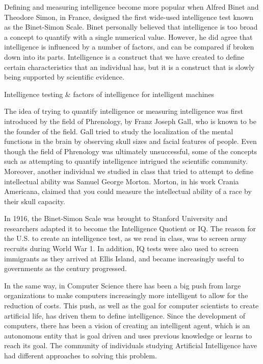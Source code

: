 \documentclass[11pt]{article}
\begin{document}
\par Defining and measuring intelligence become more popular when Alfred Binet and Theodore Simon, in France, designed the first wide-used intelligence test known as the Binet-Simon Scale. Binet personally believed that intelligence is too broad a concept to quantify with a single numerical value. However, he did agree that intelligence is influenced by a number of factors, and can be compared if broken down into its parts. Intelligence is a construct that we have created to define certain characteristics that an individual has, but it is a construct that is slowly being supported by scientific evidence.

\begin{center}
	{\large Intelligence testing \& factors of intelligence for intelligent machines\par}
\end{center}

\par The idea of trying to quantify intelligence or measuring intelligence was first introduced by the field of Phrenology, by Franz Joseph Gall, who is known to be the founder of the field. Gall tried to study the localization of the mental functions in the brain by observing skull sizes and facial features of people. Even though the field of Phrenology was ultimately unsuccessful, some of the concepts such as attempting to quantify intelligence intrigued the scientific community. Moreover, another individual we studied in class that tried to attempt to define intellectual ability was Samuel George Morton. Morton, in his work Crania Americana, claimed that you could measure the intellectual ability of a race by their skull capacity. 

\par In 1916, the Binet-Simon Scale was brought to Stanford University and researchers adapted it to become the Intelligence Quotient or IQ. The reason for the U.S. to create an intelligence test, as we read in class, was to screen army recruits during World War 1. In addition, IQ tests were also used to screen immigrants as they arrived at Ellis Island, and became increasingly useful to governments as the century progressed. 

\par In the same way, in Computer Science there has been a big push from large organizations to make computers increasingly more intelligent to allow for the reduction of costs. This push, as well as the goal for computer scientists to create artificial life, has driven them to define intelligence. Since the development of computers, there has been a vision of creating an intelligent agent, which is an autonomous entity that is goal driven and uses previous knowledge or learns to reach its goal. The community of individuals studying Artificial Intelligence have had different approaches to solving this problem. 
\end{document}
